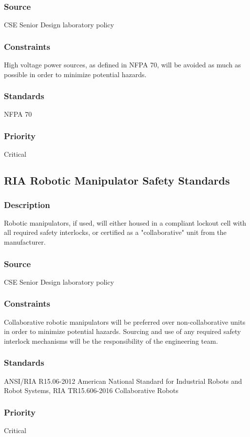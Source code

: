 \subsubsection{Source}
CSE Senior Design laboratory policy
\subsubsection{Constraints}
High voltage power sources, as defined in NFPA 70, will be avoided as much as possible in order to minimize potential hazards.
\subsubsection{Standards}
 NFPA 70

\subsubsection{Priority}
Critical

\subsection{RIA Robotic Manipulator Safety Standards}
\subsubsection{Description}
Robotic manipulators, if used, will either housed in a compliant lockout cell with all required safety interlocks, or certified as a "collaborative" unit from the manufacturer.

\subsubsection{Source}
CSE Senior Design laboratory policy
\subsubsection{Constraints}
Collaborative robotic manipulators will be preferred over non-collaborative units in order to minimize potential hazards. Sourcing and use of any required safety interlock mechanisms will be the responsibility of the engineering team.
\subsubsection{Standards}
 ANSI/RIA R15.06-2012 American National Standard for Industrial Robots and Robot
 Systems, RIA TR15.606-2016 Collaborative Robots
 
\subsubsection{Priority}
Critical


 
